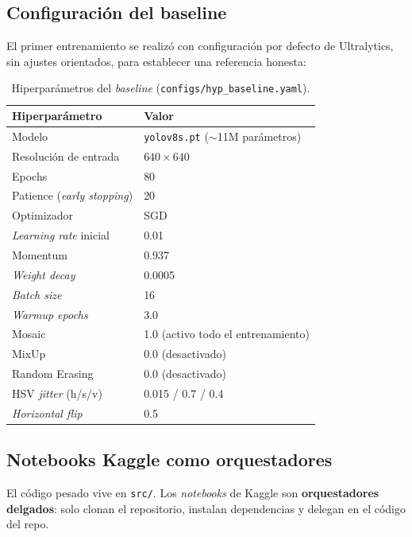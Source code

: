 \documentclass[journal,onecolumn,11pt]{IEEEtran}
\begin{document}
\subsection{Configuración del baseline}

El primer entrenamiento se realizó con configuración por defecto de
Ultralytics, sin ajustes orientados, para establecer una referencia
honesta:

\begin{table}[H]
\centering
\caption{Hiperparámetros del \textit{baseline}
(\texttt{configs/hyp\_baseline.yaml}).}
\label{tab:hyp_baseline}
\begin{tabular}{l l}
\toprule
\textbf{Hiperparámetro} & \textbf{Valor} \\
\midrule
Modelo & \texttt{yolov8s.pt} ($\sim$11M parámetros) \\
Resolución de entrada & $640 \times 640$ \\
Epochs & 80 \\
Patience (\textit{early stopping}) & 20 \\
Optimizador & SGD \\
\textit{Learning rate} inicial & 0.01 \\
Momentum & 0.937 \\
\textit{Weight decay} & 0.0005 \\
\textit{Batch size} & 16 \\
\textit{Warmup epochs} & 3.0 \\
Mosaic & 1.0 (activo todo el entrenamiento) \\
MixUp & 0.0 (desactivado) \\
Random Erasing & 0.0 (desactivado) \\
HSV \textit{jitter} (h/s/v) & 0.015 / 0.7 / 0.4 \\
\textit{Horizontal flip} & 0.5 \\
\bottomrule
\end{tabular}
\end{table}

\subsection{Notebooks Kaggle como orquestadores}

El código pesado vive en \texttt{src/}. Los \textit{notebooks} de
Kaggle son \textbf{orquestadores delgados}: solo clonan el
repositorio, instalan dependencias y delegan en el código del repo.
\end{document}
